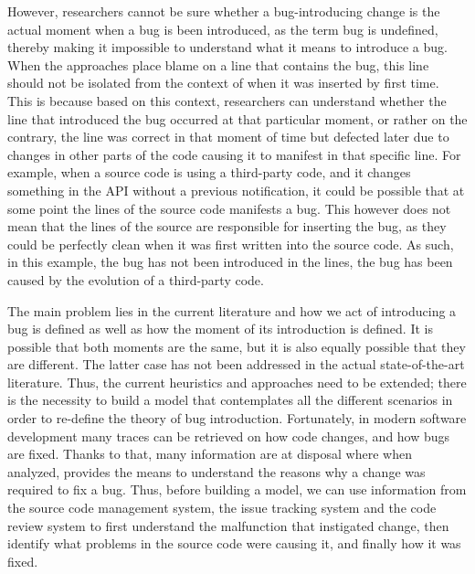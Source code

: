 \documentclass[a4paper, 12pt]{book}
\begin{document}
However, researchers cannot be sure whether a bug-introducing change is the actual moment when a bug is been introduced, as the term bug is undefined, thereby making it impossible to understand what it means to introduce a bug. When the approaches place blame on a line that contains the bug, this line should not be isolated from the context of when it was inserted by first time. This is because based on this context, researchers can understand whether the line that introduced the bug occurred at that particular moment, or rather on the contrary, the line was correct in that moment of time but defected later due to changes in other parts of the code causing it to manifest in that specific line. For example, when a source code is using a third-party code, and it changes something in the API without a previous notification, it could be possible that at some point the lines of the source code  manifests a bug. This however does not mean that the lines of the source are responsible for inserting the bug, as they could be perfectly clean when it was first written into the source code. As such, in this example, the bug has not been introduced in the lines, the bug has been caused by the evolution of a third-party code.

The main problem lies in the current literature and  how we act of introducing a bug is defined as well as how the moment of its introduction is defined. It is possible that both moments are the same, but it is also equally possible that they are different. The latter case has not been addressed in the actual state-of-the-art literature. Thus, the current heuristics and approaches need to be extended;  there is the necessity to build a model that contemplates all the different scenarios in order to re-define the theory of bug introduction. Fortunately, in modern software development many traces can be retrieved on how code changes, and how bugs are fixed. Thanks to that, many information are at disposal where when analyzed, provides the means to understand the reasons why a change was required to fix a bug. Thus, before building a model, we can use information from the source code management system, the issue tracking system and the code review system to first understand the malfunction that instigated change, then identify what problems in the source code were causing it, and finally how it was fixed.
\end{document}
